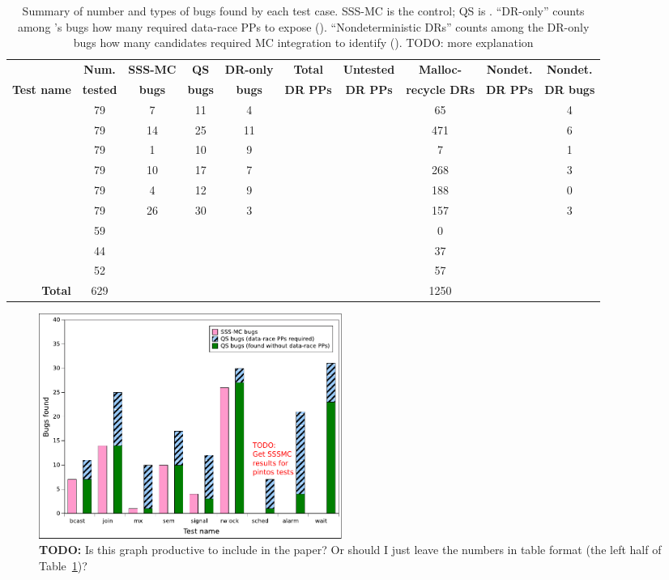 \begin{table}[t]
	\begin{center}
	\begin{tabular}{r|c||c|c|c||c|c|c|c|c}
		& {\bf Num.} & {\bf SSS-MC} & {\bf QS} & {\bf DR-only} & {\bf Total} & {\bf Untested} & {\bf Malloc-} & {\bf Nondet.} & {\bf Nondet.} \\
		{\bf Test name} & {\bf tested} & {\bf bugs} & {\bf bugs} & {\bf bugs} & {\bf DR PPs} & {\bf DR PPs} & {\bf recycle DRs} & {\bf DR PPs} & {\bf DR bugs} \\
		\hline
		{\bct		} & 79	& 7	& 11	& 4	&	&	& 65	&	& 4	\\
		{\tej		} & 79	& 14 	& 25	& 11	&	&	& 471	&	& 6	\\
		{\mxtest	} & 79	& 1	& 10	& 9	&	&	& 7	&	& 1	\\
		{\paradise	} & 79	& 10	& 17	& 7	&	&	& 268	&	& 3	\\
		{\paraguay	} & 79	& 4	& 12	& 9	&	&	& 188	&	& 0	\\
		{\rwldgr	} & 79	& 26	& 30	& 3	&	&	& 157	&	& 3	\\
		\hline
		{\prisema	} & 59	&	&	&	&	&	& 0	&	&	\\
		{\alarmsimul	} & 44	&	&	&	&	&	& 37	&	&	\\
		{\waitsimple	} & 52	&	&	&	&	&	& 57	&	&	\\
		\hline
		{\bf Total}	& 629	&	&	&	&	&	& 1250	&	&
	\end{tabular}
	\end{center}
	\caption{Summary of number and types of bugs found by each test case.
		SSS-MC is the control; QS is \quicksand.
		``DR-only'' counts among \quicksand's bugs how many required data-race PPs to expose (\sect{\ref{sec:eval-sssmc}}).
	``Nondeterministic DRs'' counts among the DR-only bugs how many candidates required MC integration to identify (\sect{\ref{sec:eval-falseneg}}).
		TODO: more explanation}
	\label{tab:drbugs}
\end{table}

\begin{figure}[t]
	\includegraphics[width=0.48\textwidth]{bargraph.pdf}
	\caption{{\bf TODO:} Is this graph productive to include in the paper? Or should I just leave the numbers in table format (the left half of Table~\ref{tab:drbugs})?}
	\label{fig:bargraph}
\end{figure}


